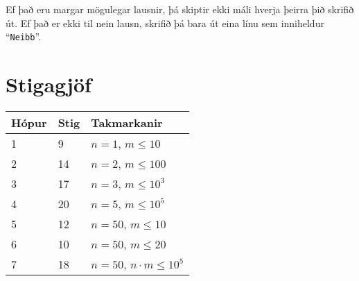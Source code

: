Ef það eru margar mögulegar lausnir, þá skiptir ekki máli hverja þeirra þið
skrifið út. Ef það er ekki til nein lausn, skrifið þá bara út eina línu sem
inniheldur ``\texttt{Neibb}''.

\section*{Stigagjöf}
\begin{tabular}{|l|l|l|}
\hline
Hópur & Stig & Takmarkanir \\ \hline
1     & 9   & $n = 1$, $m \leq 10$ \\ \hline
2     & 14   & $n = 2$, $m \leq 100$ \\ \hline
3     & 17   & $n = 3$, $m \leq 10^3$ \\ \hline
4     & 20   & $n = 5$, $m \leq 10^5$ \\ \hline
5     & 12   & $n = 50$, $m \leq 10$ \\ \hline
6     & 10   & $n = 50$, $m \leq 20$ \\ \hline
7     & 18   & $n = 50$, $n\cdot m \leq 10^5$ \\ \hline
\end{tabular}

